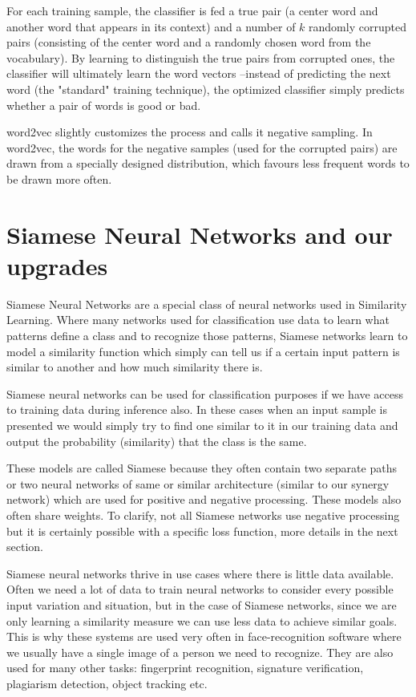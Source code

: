 \documentclass[b5paper]{book}
\let\cite\parencite
\begin{document}
For each training sample, the classifier is fed a true pair (a center word and another word that appears in its context) and a number of \(k\) randomly corrupted pairs (consisting of the center word and a randomly chosen word from the vocabulary). By learning to distinguish the true pairs from corrupted ones, the classifier will ultimately learn the word vectors --instead of predicting the next word (the "standard" training technique), the optimized classifier simply predicts whether a pair of words is good or bad.

word2vec \cite{mikolov2013efficient} slightly customizes the process and calls it negative sampling. In word2vec, the words for the negative samples (used for the corrupted pairs) are drawn from a specially designed distribution, which favours less frequent words to be drawn more often.



\chapter{Siamese Neural Networks and our upgrades}

Siamese Neural Networks \cite{koch2015siamese} are a special class of neural networks used in Similarity Learning. Where many networks used for classification use data to learn what patterns define a class and to recognize those patterns, Siamese networks learn to model a similarity function which simply can tell us if a certain input pattern is similar to another and how much similarity there is.

Siamese neural networks can be used for classification purposes if we have access to training data during inference also. In these cases when an input sample is presented we would simply try to find one similar to it in our training data and output the probability (similarity) that the class is the same. 

These models are called Siamese because they often contain two separate paths or two neural networks of same or similar architecture (similar to our synergy network) which are used for positive and negative processing. These models also often share weights. To clarify, not all Siamese networks use negative processing but it is certainly possible with a specific loss function, more details in the next section.

Siamese neural networks thrive in use cases where there is little data available. Often we need a lot of data to train neural networks to consider every possible input variation and situation, but in the case of Siamese networks, since we are only learning a similarity measure we can use less data to achieve similar goals. This is why these systems are used very often in face-recognition software where we usually have a single image of a person we need to recognize. They are also used for many other tasks: fingerprint recognition, signature verification, plagiarism detection, object tracking etc.
\end{document}
